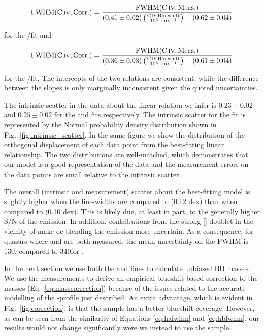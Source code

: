 \begin{equation}
    \label{eq:hafwhm}
    \rm{FWHM}(\rm{C}\,\textsc{iv}, \rm{Corr.}) = \frac{\rm{FWHM}(\rm{C}\,\textsc{iv}, \rm{Meas.})}{ (0.41\pm0.02) \left(\frac{\rm{C}\,\textsc{iv}\, Blueshift}{10^3 {\rm \,km\,s^{-1}}} \right) + (0.62\pm0.04)}
\end{equation}

\noindent for the /\ha fit and 

\begin{equation}
    \label{eq:hbfwhm}
    \rm{FWHM}(\rm{C}\,\textsc{iv}, \rm{Corr.}) = \frac{\rm{FWHM}(\rm{C}\,\textsc{iv}, \rm{Meas.})}{ (0.36\pm0.03) \left(\frac{\rm{C}\,\textsc{iv}\, Blueshift}{10^3 {\rm \,km\,s^{-1}}} \right) + (0.61\pm0.04)}
\end{equation}

\noindent for the /\hb fit. 
The intercepts of the two relations are consistent, while the difference between the slopes is only marginally inconsistent given the quoted uncertainties. 

The intrinsic scatter in the data about the linear relation we infer is $0.23 \pm 0.02$ and $0.25 \pm 0.02$ for the \ha and \hb fits respectively. 
The intrinsic scatter for the \ha fit is represented by the Normal probability density distribution shown in Fig.~\ref{fig:intrinsic_scatter}. 
In the same figure we show the distribution of the orthogonal displacement of each data point from the best-fitting linear relationship. 
The two distributions are well-matched, which demonstrates that our model is a good representation of the data and the measurement errors on the data points are small relative to the intrinsic scatter.    

The overall (intrinsic and measurement) scatter about the best-fitting model is slightly higher when the  line-widths are compared to \hb (0.12 dex) than when compared to \ha (0.10 dex). 
This is likely due, at least in part, to the generally higher S/N of the \ha emission. 
In addition, contributions from the strong [] doublet in the vicinity of \hb make de-blending the \hb emission more uncertain. 
As a consequence, for quasars where \ha and \hb are both measured, the mean uncertainty on the \ha FWHM is 130\kms, compared to 340\kms for \hbns. 

In the next section we use both the \ha and \hb lines to calculate unbiased BH masses. 
We use the \ha measurements to derive an empirical  blueshift based correction to the  masses (Eq.~\ref{eq:masscorrection}) because of the issues related to the accurate modelling of the \hbns-profile just described.  
An extra advantage, which is evident in Fig.~\ref{fig:correction}, is that the \ha sample has a better  blueshift coverage. 
However, as can be seen from the similarity of Equations \ref{eq:hafwhm} and \ref{eq:hbfwhm}, our results would not change significantly were we instead to use the \hb sample. 

